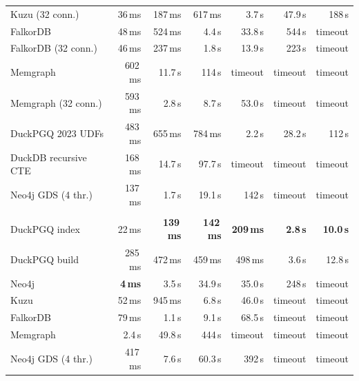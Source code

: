 \begin{table}[t]
\begin{tabular}{lrrrrrr}
\quad Kuzu (32 conn.) & 36\,ms & 187\,ms & 617\,ms & 3.7\,s & 47.9\,s & 188\,s \\
\quad FalkorDB & 48\,ms & 524\,ms & 4.4\,s & 33.8\,s & 544\,s & timeout \\
\quad FalkorDB (32 conn.) & 46\,ms & 237\,ms & 1.8\,s & 13.9\,s & 223\,s & timeout \\
\quad Memgraph & 602\,ms & 11.7\,s & 114\,s & timeout & timeout & timeout \\
\quad Memgraph (32 conn.) & 593\,ms & 2.8\,s & 8.7\,s & 53.0\,s & timeout & timeout \\
\quad DuckPGQ 2023 UDFs & 483\,ms & 655\,ms & 784\,ms & 2.2\,s & 28.2\,s & 112\,s \\
\quad DuckDB recursive CTE & 168\,ms & 14.7\,s & 97.7\,s & timeout & timeout & timeout \\
\quad Neo4j GDS (4 thr.) & 137\,ms & 1.7\,s & 19.1\,s & 142\,s & timeout & timeout \\
\addlinespace
\multicolumn{7}{l}{\textit{LDBC SF300}} \\
\quad DuckPGQ index & 22\,ms & \textbf{139\,ms} & \textbf{142\,ms} & \textbf{209\,ms} & \textbf{2.8\,s} & \textbf{10.0\,s} \\
\quad DuckPGQ build & 285\,ms & 472\,ms & 459\,ms & 498\,ms & 3.6\,s & 12.8\,s \\
\quad Neo4j & \textbf{4\,ms} & 3.5\,s & 34.9\,s & 35.0\,s & 248\,s & timeout \\
\quad Kuzu & 52\,ms & 945\,ms & 6.8\,s & 46.0\,s & timeout & timeout \\
\quad FalkorDB & 79\,ms & 1.1\,s & 9.1\,s & 68.5\,s & timeout & timeout \\
\quad Memgraph & 2.4\,s & 49.8\,s & 444\,s & timeout & timeout & timeout \\
\quad Neo4j GDS (4 thr.) & 417\,ms & 7.6\,s & 60.3\,s & 392\,s & timeout & timeout \\
\bottomrule\end{tabular}\end{table}
